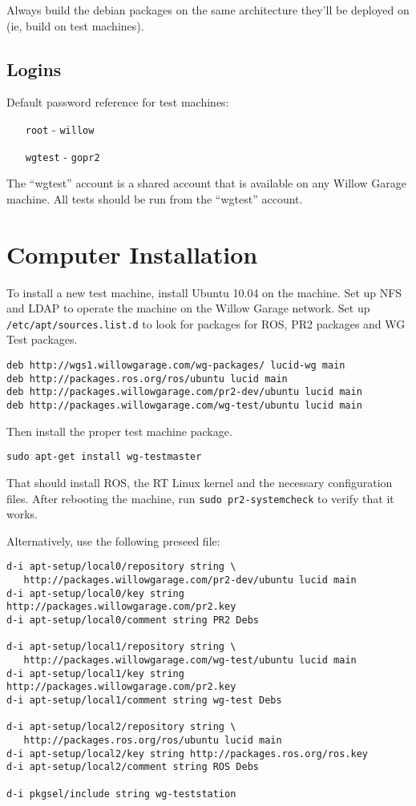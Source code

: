 \documentclass[11pt]{report}
\begin{document}
Always build the debian packages on the same architecture they'll be deployed on (ie, build on test machines).

\subsection{Logins}

Default password reference for test machines:
\begin{itemize}
\item [\texttt{root}] - \texttt{willow}
\item [\texttt{wgtest}] - \texttt{gopr2}
\end{itemize}
The ``wgtest'' account is a shared account that is available on any Willow Garage machine. All tests should be run from the ``wgtest'' account.

\section{Computer Installation}

To install a new test machine, install Ubuntu 10.04 on the machine. Set up NFS and LDAP to operate the machine on the Willow Garage network. Set up \texttt{/etc/apt/sources.list.d} to look for packages for ROS, PR2 packages and WG Test packages.

\begin{verbatim}
deb http://wgs1.willowgarage.com/wg-packages/ lucid-wg main
deb http://packages.ros.org/ros/ubuntu lucid main
deb http://packages.willowgarage.com/pr2-dev/ubuntu lucid main
deb http://packages.willowgarage.com/wg-test/ubuntu lucid main
\end{verbatim}

Then install the proper test machine package.
\begin{verbatim}
sudo apt-get install wg-testmaster
\end{verbatim}
That should install ROS, the RT Linux kernel and the necessary configuration files. After rebooting the machine, run \texttt{sudo pr2-systemcheck} to verify that it works.

Alternatively, use the following preseed file:
\begin{verbatim}
d-i apt-setup/local0/repository string \
   http://packages.willowgarage.com/pr2-dev/ubuntu lucid main
d-i apt-setup/local0/key string http://packages.willowgarage.com/pr2.key
d-i apt-setup/local0/comment string PR2 Debs

d-i apt-setup/local1/repository string \
   http://packages.willowgarage.com/wg-test/ubuntu lucid main
d-i apt-setup/local1/key string http://packages.willowgarage.com/pr2.key
d-i apt-setup/local1/comment string wg-test Debs

d-i apt-setup/local2/repository string \
   http://packages.ros.org/ros/ubuntu lucid main
d-i apt-setup/local2/key string http://packages.ros.org/ros.key
d-i apt-setup/local2/comment string ROS Debs

d-i pkgsel/include string wg-teststation
\end{verbatim}
\end{document}
